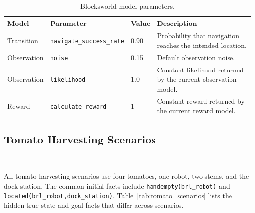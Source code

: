 \begin{table}[H]
\centering
\small
\caption{Blocksworld model parameters.}
\label{tab:blocksworld_model_params}
\begin{tabularx}{\linewidth}{lllX}
\toprule
Model & Parameter & Value & Description \\
\midrule
Transition & \texttt{navigate\_success\_rate} & 0.90 & Probability that navigation reaches the intended location. \\
Observation & \texttt{noise} & 0.15 & Default observation noise. \\
Observation & \texttt{likelihood} & 1.0 & Constant likelihood returned by the current observation model. \\
Reward & \texttt{calculate\_reward} & 1 & Constant reward returned by the current reward model. \\
\bottomrule
\end{tabularx}
\end{table}

\subsection{Tomato Harvesting Scenarios}~\label{app:tomato_scenarios}

All tomato harvesting scenarios use four tomatoes, one robot, two stems, and the dock station. The common initial facts include \texttt{handempty(brl\_robot)} and \texttt{located(brl\_robot,dock\_station)}. Table~\ref{tab:tomato_scenarios} lists the hidden true state and goal facts that differ across scenarios.

